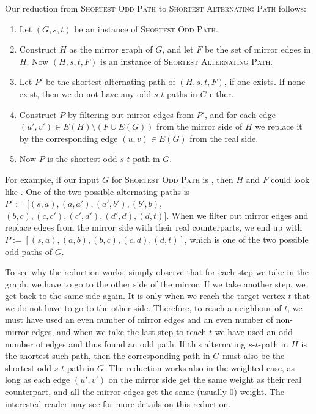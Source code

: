 Our reduction from \textsc{Shortest Odd Path} to \textsc{Shortest Alternating Path} follows:
\begin{enumerate}
    \item Let $(G, s, t)$ be an instance of \textsc{Shortest Odd Path}.
    \item Construct $H$ as the mirror graph of $G$, and let $F$ be the set of mirror edges in $H$. Now $(H, s, t, F)$ is an instance of \textsc{Shortest Alternating Path}.
    \item Let $P'$ be the shortest alternating path of $(H, s, t, F)$, if one exists. If none exist, then we do not have any odd $s$-$t$-paths in $G$ either.
    \item Construct $P$ by filtering out mirror edges from $P'$, and for each edge $(u',v') \in E(H) \setminus (F \cup E(G))$ from the mirror side of $H$ we replace it by the corresponding edge $(u,v) \in E(G)$ from the real side.
    \label{point:translate_alternating_path}
    \item Now $P$ is the shortest odd $s$-$t$-path in $G$.
\end{enumerate}

For example, if our input $G$ for \textsc{Shortest Odd Path} is , then $H$ and $F$ could look like . One of the two possible alternating paths is $P' := [(s,a), (a, a'), (a',b'), (b',b)$, $(b,c), (c,c'), (c',d'), (d',d), (d,t)]$. When we filter out mirror edges and replace edges from the mirror side with their real counterparts, we end up with $P := [(s,a),(a,b),(b,c),(c,d),(d,t)]$, which is one of the two possible odd paths of $G$. 

To see why the reduction works, simply observe that for each step we take in the graph, we have to go to the other side of the mirror. If we take another step, we get back to the same side again. It is only when we reach the target vertex $t$ that we do not have to go to the other side. Therefore, to reach a neighbour of $t$, we must have used an even number of mirror edges and an even number of non-mirror edges, and when we take the last step to reach $t$ we have used an odd number of edges and thus found an odd path. If this alternating $s$-$t$-path in $H$ is the shortest such path, then the corresponding path in $G$ must also be the shortest odd $s$-$t$-path in $G$. The reduction works also in the weighted case, as long as each edge $(u',v')$ on the mirror side get the same weight as their real counterpart, and all the mirror edges get the same (usually 0) weight. The interested reader may see \cite{source:derigs_shortest_odd_path} for more details on this reduction.

